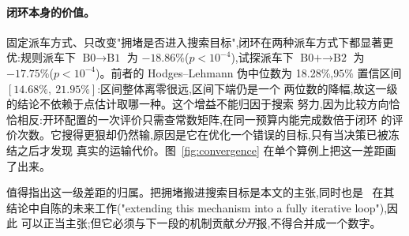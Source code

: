 \documentclass[manuscript,screen,review]{acmart}
\newcommand{\NPairs}{100}
\newcommand{\GainLoopRule}{18.86\%}      %
\newcommand{\PLoopRule}{<10^{-4}}
\newcommand{\GainLoopProbe}{17.75\%}     %
\newcommand{\PLoopProbe}{<10^{-4}}
\newcommand{\HLLoopRule}{18.28\%}
\newcommand{\CILoopRule}{$[14.68\%,\ 21.95\%]$}
\begin{document}
\begin{table}[t]
\caption{四级阶梯在同挂钟预算下的完工时间,以及 $2\times 2$ 析因的四个单因子配对比较。
负值表示完工时间下降,即更好。$n=\NPairs$ 个按 $(\text{算例},\text{种子})$ 配对的比较,
双侧 Wilcoxon 符号秩检验;$p$ 值已按本表五个对比做 Holm 校正
($^{*}p<0.05$、$^{**}p<0.01$、$^{***}p<0.001$)。HL 列为逐对相对增益的 Hodges--Lehmann
伪中位数及其 $95\%$ 分布无关置信区间,与左侧的均值口径不同(见第~\ref{sec:protocol}~小节):
均值便于跨表相加,伪中位数则与同行的检验同源并带精度。}
\label{tab:main}
\small

\end{table}

\paragraph{闭环本身的价值。}
固定派车方式、只改变"拥堵是否进入搜索目标",闭环在两种派车方式下都显著更优:规则派车下
$\text{B0}\to\text{B1}$ 为 $-\GainLoopRule$($p\PLoopRule$),试探派车下
$\text{B0+}\to\text{B2}$ 为 $-\GainLoopProbe$($p\PLoopProbe$)。前者的 Hodges--Lehmann
伪中位数为 \HLLoopRule{},$95\%$ 置信区间 \CILoopRule{}:区间整体离零很远,区间下端仍是一个
两位数的降幅,故这一级的结论不依赖于点估计取哪一种。这个增益不能归因于搜索
努力,因为比较方向恰恰相反:开环配置的一次评价只需查常数矩阵,在同一预算内能完成数倍于闭环
的评价次数。它搜得更狠却仍然输,原因是它在优化一个错误的目标,只有当决策已被冻结之后才发现
真实的运输代价。图~\ref{fig:convergence} 在单个算例上把这一差距画了出来。

值得指出这一级差距的归属。把拥堵搬进搜索目标是本文的主张,同时也是~\cite{li2026framework}
在其结论中自陈的未来工作("extending this mechanism into a fully iterative loop"),因此
可以正当主张;但它必须与下一段的机制贡献\emph{分开}报,不得合并成一个数字。
\end{document}
